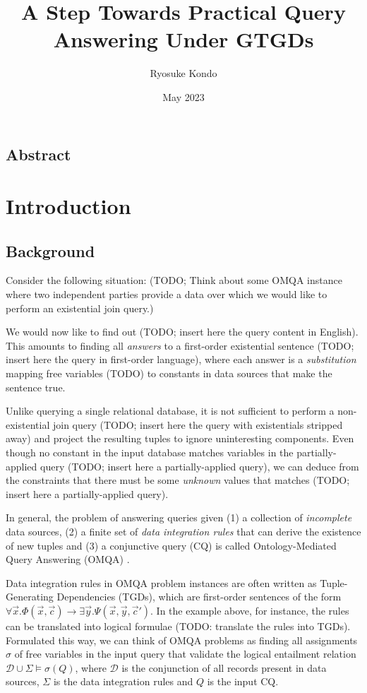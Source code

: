 \documentclass[12pt]{report}
\title{A Step Towards Practical Query Answering Under GTGDs}
\author{Ryosuke Kondo}
\date{May 2023}
\theoremstyle{plain}
\theoremstyle{definition}
\begin{document}
\maketitle

\newpage
\tableofcontents
\newpage

\section*{Abstract}

\newpage
\chapter{Introduction}

\section{Background}

Consider the following situation: (TODO; Think about some OMQA instance where two independent parties provide a data over which we would like to perform an existential join query.)

We would now like to find out (TODO; insert here the query content in English). This amounts to finding all \emph{answers} to a first-order existential sentence (TODO; insert here the query in first-order language), where each answer is a \emph{substitution} mapping free variables (TODO) to constants in data sources that make the sentence true.

Unlike querying a single relational database, it is not sufficient to perform a non-existential join query (TODO; insert here the query with existentials stripped away) and project the resulting tuples to ignore uninteresting components. Even though no constant in the input database matches variables in the partially-applied query (TODO; insert here a partially-applied query), we can deduce from the constraints that there must be some \emph{unknown} values that matches (TODO; insert here a partially-applied query).

In general, the problem of answering queries given (1) a collection of \emph{incomplete} data sources, (2) a finite set of \emph{data integration rules} that can derive the existence of new tuples and (3) a conjunctive query (CQ) is called Ontology-Mediated Query Answering (OMQA) \cite{bienvenu16}.

Data integration rules in OMQA problem instances are often written as Tuple-Generating Dependencies (TGDs), which are first-order sentences of the form $\forall \vec{x}. \Phi(\vec{x}, \vec{c}) \rightarrow \exists \vec{y}. \Psi(\vec{x}, \vec{y}, \vec{c}')$. In the example above, for instance, the rules can be translated into logical formulae (TODO: translate the rules into TGDs). Formulated this way, we can think of OMQA problems as finding all assignments $\sigma$ of free variables in the input query that validate the logical entailment relation $\mathcal{D} \cup \Sigma \models \sigma(Q)$, where $\mathcal{D}$ is the conjunction of all records present in data sources, $\Sigma$ is the data integration rules and $Q$ is the input CQ.
\end{document}
